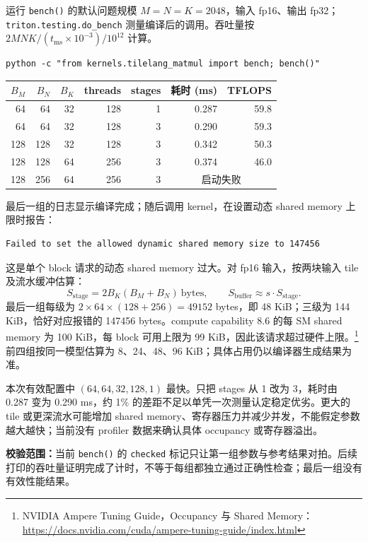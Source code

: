 \documentclass[11pt,a4paper,fontset=none]{ctexart}
\begin{document}
\begin{tcolorbox}[title={7.6 matmul 参数实验（2026-09-11）},breakable]
运行 \texttt{bench()} 的默认问题规模 $M=N=K=2048$，输入 fp16、输出 fp32；\texttt{triton.testing.do\_bench} 测量编译后的调用。吞吐量按 $2MNK/(t_{\mathrm{ms}}\times10^{-3})/10^{12}$ 计算。
\begin{lstlisting}
python -c "from kernels.tilelang_matmul import bench; bench()"
\end{lstlisting}
\begin{center}\small
\setlength{\tabcolsep}{5pt}
\begin{tabular}{@{}rrrrrrr@{}}
\toprule
$B_M$ & $B_N$ & $B_K$ & threads & stages & 耗时 (ms) & TFLOPS \\
\midrule
64  & 64  & 32 & 128 & 1 & 0.287 & 59.8 \\
64  & 64  & 32 & 128 & 3 & 0.290 & 59.3 \\
128 & 128 & 32 & 128 & 3 & 0.342 & 50.3 \\
128 & 128 & 64 & 256 & 3 & 0.374 & 46.0 \\
128 & 256 & 64 & 256 & 3 & \multicolumn{2}{c}{启动失败} \\
\bottomrule
\end{tabular}
\end{center}

最后一组的日志显示编译完成；随后调用 kernel，在设置动态 shared memory 上限时报告：
\begin{lstlisting}
Failed to set the allowed dynamic shared memory size to 147456
\end{lstlisting}
这是单个 block 请求的动态 shared memory 过大。对 fp16 输入，按两块输入 tile 及流水缓冲估算：
\[
S_{\mathrm{stage}}=2B_K(B_M+B_N)\ \text{bytes},\qquad
S_{\mathrm{buffer}}\approx s\cdot S_{\mathrm{stage}}.
\]
最后一组每级为 $2\times64\times(128+256)=49152$ bytes，即 48 KiB；三级为 144 KiB，恰好对应报错的 147456 bytes。compute capability 8.6 的每 SM shared memory 为 100 KiB，每 block 可用上限为 99 KiB，因此该请求超过硬件上限。\footnote{NVIDIA Ampere Tuning Guide，Occupancy 与 Shared Memory：\url{https://docs.nvidia.com/cuda/ampere-tuning-guide/index.html}} 前四组按同一模型估算为 8、24、48、96 KiB；具体占用仍以编译器生成结果为准。

本次有效配置中 $(64,64,32,128,1)$ 最快。只把 stages 从 1 改为 3，耗时由 0.287 变为 0.290 ms，约 1\% 的差距不足以单凭一次测量认定稳定优劣。更大的 tile 或更深流水可能增加 shared memory、寄存器压力并减少并发，不能假定参数越大越快；当前没有 profiler 数据来确认具体 occupancy 或寄存器溢出。

\textbf{校验范围：}当前 \texttt{bench()} 的 \texttt{checked} 标记只让第一组参数与参考结果对拍。后续打印的吞吐量证明完成了计时，不等于每组都独立通过正确性检查；最后一组没有有效性能结果。
\end{tcolorbox}
\end{document}
